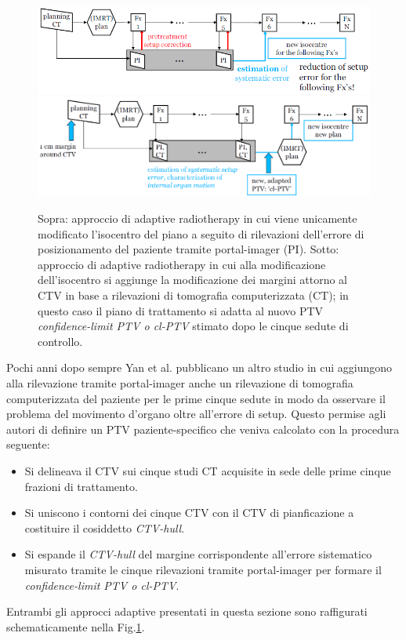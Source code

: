 \begin{figure}[!t]
\centering
\includegraphics[width=\textwidth]{./cap3/adapt1.png}
\includegraphics[width=\textwidth]{./cap3/adapt2.png}
\caption{Sopra: approccio di adaptive radiotherapy in cui viene unicamente modificato l'isocentro del piano a seguito di rilevazioni dell'errore di posizionamento del paziente tramite portal-imager (PI). Sotto: approccio di adaptive radiotherapy in cui alla modificazione dell'isocentro si aggiunge la modificazione dei margini attorno al CTV in base a rilevazioni di tomografia computerizzata (CT); in questo caso il piano di trattamento si adatta al nuovo PTV \textit{confidence-limit PTV o cl-PTV} stimato dopo le cinque sedute di controllo.}
\label{fig:adaptYAN}
\end{figure}

Pochi anni dopo sempre Yan et al.\cite{Yan2000} pubblicano un altro studio in cui aggiungono alla rilevazione tramite portal-imager anche un rilevazione di tomografia computerizzata del paziente per le prime cinque sedute in modo da osservare il problema del movimento d'organo oltre all'errore di setup. Questo permise agli autori di definire un PTV paziente-specifico che veniva calcolato con la procedura seguente:
\begin{itemize}
\item Si delineava il CTV sui cinque studi CT acquisite in sede delle prime cinque frazioni di trattamento.
\item Si uniscono i contorni dei cinque CTV con il CTV di pianficazione a costituire il cosiddetto \textit{CTV-hull}.
\item Si espande il \textit{CTV-hull} del margine corrispondente all'errore sistematico misurato tramite le cinque rilevazioni tramite portal-imager per formare il \textit{confidence-limit PTV o cl-PTV}. 
\end{itemize}
Entrambi gli approcci adaptive presentati in questa sezione sono raffigurati schematicamente nella Fig.\ref{fig:adaptYAN}.

